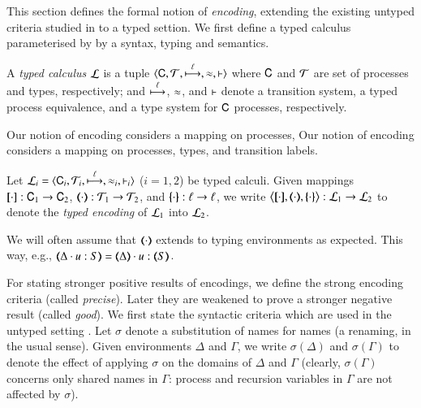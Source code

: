 This section defines the formal notion of \emph{encoding}, 
extending the existing untyped criteria studied in 
\cite{Palamidessi,Gorhan,AAA} to a typed settion. 
We first define a typed calculus parameterised by 
by a syntax, typing and semantics. 

\smallskip 

\begin{definition}\label{d:tcalculus}\rm
	A \emph{typed calculus} $\mathcal{L}$ is a tuple
          $\calc{\CAL}{\cal{T}}{\hby{\ell}}{\wb}{\proves}$
	where $\mathsf{C}$ and $\cal{T}$ are set of processes and types, 
respectively; and $\stackrel{\ell}{\longmapsto}$, $\approx$, and $\vdash$ 
	denote a transition system, a typed process equivalence, and a type system for $\mathsf{C}$ processes, respectively. 
\end{definition}

\smallskip 

Our notion of encoding considers a mapping on processes, 
Our notion of encoding considers a mapping on processes, 
types, 
and transition labels.  

\begin{definition}\rm
        Let  $\tyl{L}_i=\calc{\CAL_i}{{\cal{T}}_i}{\hby{\ell}}{\wb_i}{\proves_i}$
        ($i=1,2$) be typed calculi. 
	Given mappings $[\!\![\cdot]\!\!]: \mathsf{C}_1 \to \mathsf{C}_2$, 
	$\mapt{\cdot}: {\cal{T}}_1 \to {\cal{T}}_2$, and 
	$\{\!\!\{\cdot\}\!\!\}: \ell \to \ell$, 
	we write 
	$\enco{\map{\cdot}, \mapt{\cdot}, \mapa{\cdot}} : \tyl{L}_1 \to \tyl{L}_2$ to denote the \emph{typed encoding} of $\mathcal{L}_1$ into $\mathcal{L}_2$.
\end{definition}

\smallskip 

\noi We will often assume that  $(\!\!\langle\cdot\rangle\!\!)$ extends to typing
environments as expected. This way, e.g., $\mapt{\Delta \cat u:S} = \mapt{\Delta} \cat u:\mapt{S}$.

For stating stronger positive results of encodings, 
we define the strong encoding criteria (called {\em precise}). Later 
they are weakened to prove a stronger negative result (called {\em good}). 
We first state the 
syntactic criteria which are used in the untyped setting \cite{}. 
Let $\sigma$ denote a substitution of names for names (a renaming, in the usual sense). Given environments $\Delta$ and $\Gamma$,
we write $\sigma(\Delta)$ and $\sigma(\Gamma)$ to denote the effect of applying $\sigma$ on the 
domains of $\Delta$ and $\Gamma$
(clearly, $\sigma(\Gamma)$ concerns only shared names in $\Gamma$: process and recursion variables in $\Gamma$ are not affected by $\sigma$). 

